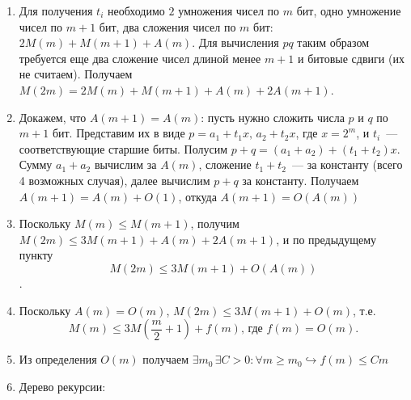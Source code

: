 \documentclass[a4paper]{article}
\begin{document}
\begin{enumerate}
\item Для получения $t_i$ необходимо $2$ умножения чисел по $m$ бит, одно умножение чисел по $m+1$ бит, два сложения чисел по $m$ бит: $2M(m)+M(m+1)+A(m)$. Для вычисления $pq$ таким образом требуется еще два сложение чисел длиной менее $m+1$ и битовые сдвиги (их не считаем). Получаем $M(2m)=2M(m)+M(m+1)+A(m)+2A(m+1)$.
\item Докажем, что $A(m+1)=A(m)$: пусть нужно сложить числа $p$ и $q$ по $m+1$ бит. Представим их в виде $p=a_1+t_1x,\,a_2+t_2x$, где $x=2^m$, и $t_i$~--- соответствующие старшие биты. Полусим $p+q=(a_1+a_2)+(t_1+t_2)x$. Сумму $a_1+a_2$ вычислим за $A(m)$, сложение $t_1+t_2$~--- за константу (всего 4 возможных случая), далее вычислим $p+q$ за константу. Получаем $A(m+1)=A(m)+O(1)$, откуда $A(m+1)=O(A(m))$
\item Поскольку $M(m)\leqslant M(m+1)$, получим $M(2m)\leqslant 3M(m+1)+A(m)+2A(m+1)$, и по предыдущему пункту $$M(2m)\leqslant 3M(m+1)+O(A(m))$$.
\item Поскольку $A(m)=O(m)$, $M(2m)\leqslant 3M(m+1)+O(m)$, т.е. $$M(m)\leqslant 3M(\frac{m}{2}+1)+f(m)\mbox{, где }f(m)=O(m).$$
\item Из определения $O(m)$ получаем $\exists m_0\,\exists C>0\colon\forall m\geqslant m_0\hookrightarrow f(m)\leqslant Cm$
\item Дерево рекурсии:\newline
{}
\end{enumerate}
\end{document}
